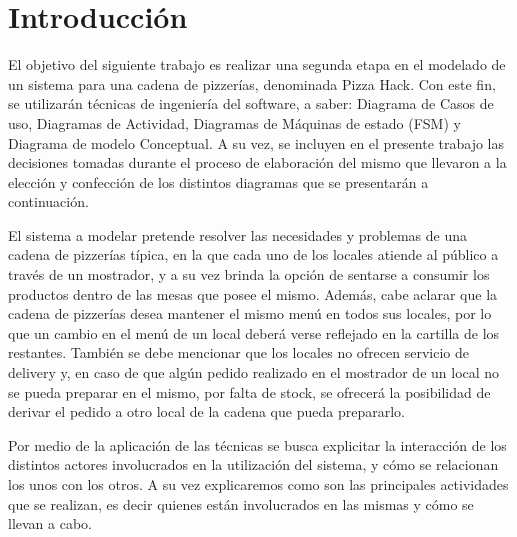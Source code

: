 \documentclass[a4paper,11pt] {article}
\begin{document}
\grupo{}

\maketitle

\bigskip

\section*{Introducci\'on}

El objetivo del siguiente trabajo es realizar una segunda etapa en el modelado de un sistema para una cadena de pizzer\'ias, denominada Pizza Hack. Con este fin, se utilizar\'an t\'ecnicas de ingenier\'ia del software, a saber: Diagrama de Casos de uso, Diagramas de Actividad, Diagramas de M\'aquinas de estado (FSM) y Diagrama de modelo Conceptual. A su vez, se incluyen en el presente trabajo las decisiones tomadas durante el proceso de elaboraci\'on del mismo que llevaron a la elecci\'on y confecci\'on de los distintos diagramas que se presentar\'an a continuaci\'on. 

El sistema a modelar pretende resolver las necesidades y problemas de una cadena de pizzer\'ias t\'ipica, en la que cada uno de los locales atiende al p\'ublico a trav\'es de un mostrador, y a su vez brinda la opci\'on de sentarse a consumir los productos dentro de las mesas que posee el mismo. Adem\'as, cabe aclarar que la cadena de pizzer\'ias desea mantener el mismo men\'u en todos sus locales, por lo que un cambio en el men\'u de un local deber\'a verse reflejado en la cartilla de los restantes. Tambi\'en se debe mencionar que los locales no ofrecen servicio de delivery y, en caso de que alg\'un pedido realizado en el mostrador de un local no se pueda preparar en el mismo, por falta de stock, se ofrecer\'a la posibilidad de derivar el pedido a otro local de la cadena que pueda prepararlo.

Por medio de la aplicaci\'on de las t\'ecnicas se busca explicitar la interacci\'on de los distintos actores involucrados en la utilizaci\'on del sistema, y c\'omo se relacionan los unos con los otros. A su vez explicaremos como son las principales actividades que se realizan, es decir quienes est\'an involucrados en las mismas y c\'omo se llevan a cabo.
\end{document}
